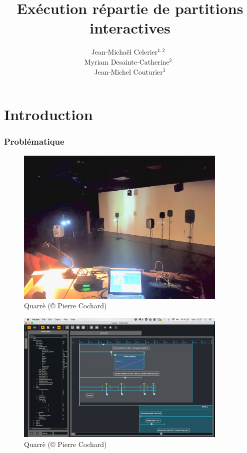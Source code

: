 \documentclass[]{beamer}
\title{Exécution répartie de partitions interactives}
\subtitle{}
\date{}
\author{Jean-Michaël Celerier$\mathsf{^{1,2}}$~\\ Myriam Desainte-Catherine$\mathsf{^{2}}$~\\ Jean-Michel Couturier$\mathsf{^{1}}$}
\institute{1. Blue Yeti --- 2. SCRIME / LaBRI}
\begin{document}
\maketitle
\begin{frame}
    \tableofcontents
\end{frame}

\section{Introduction}
\begin{frame}
    \frametitle{Problématique}
    \Large
\end{frame}

\begin{frame}
    \Large
    \begin{figure}
    	\centering
    	\includegraphics[width=0.9\textwidth]{images/quarre.jpg}
    	\caption{Quarrè (© Pierre Cochard)}
    \end{figure}
\end{frame}

\begin{frame}
\Large
\begin{figure}
	\centering
	\includegraphics[width=0.9\textwidth]{images/quarre-2.jpg}
	\caption{Quarrè (© Pierre Cochard)}
\end{figure}
\end{frame}
\end{document}
